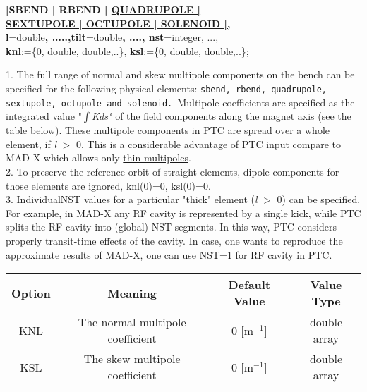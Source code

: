 \begin{description}
	\item[Additional Options for Physical Elements] 
	\item {\textbf{[SBEND | RBEND | \href{PTC_CREATE_LAYOUT0}{
                QUADRUPOLE | \\ SEXTUPOLE | OCTUPOLE | SOLENOID ], }\\ 
            l}=double\textbf{, .....,tilt}=double\textbf{, ...., nst}=integer, ...,\\
          \textbf{knl}:=\{0, double, double,..\}, \textbf{ksl}:=\{0,
          double, double,..\};} 
	\item[Description]
	1. The full range of  normal and skew multipole components on
        the bench can be  specified for the following physical elements:
        \texttt{sbend, rbend, quadrupole, sextupole,  octupole and
          solenoid. }Multipole coefficients are specified as the
        integrated value "$\int$\textit{Kds"}  of the field components
        along the magnet axis (see
        \hyperlink{Multipoles_on_Bench_(PTC_only)}{the table}
        below). These multipole components in PTC are spread over a
        whole   element, if \textit{l }$>$ 0. This is a considerable
        advantage of PTC input compare  to MAD-X  which allows only
        \href{../Introduction/multipole.html}{ thin multipoles}. \\
        2. To preserve the reference orbit of straight elements, dipole
        components  for those elements are   ignored, knl(0)=0,
        ksl(0)=0. \\ 
        3. \href{individual}{Individual}\hyperlink{NST}{NST} values for
        a  particular "thick" element (\textit{l }$>$ 0) can be
        specified. For example,  in MAD-X any RF cavity is represented
        by a single kick, while  PTC splits the RF cavity into (global)
        NST segments. In this  way, PTC considers properly transit-time
        effects of the cavity.  In case, one wants to reproduce the
        approximate results of  MAD-X, one can use NST=1 for RF cavity
        in PTC. 
      \item[Multipoles on Bench  (PTC only)] 
        \begin{tabular}{cccc}
          \hline 
          \textbf{Option} & \textbf{Meaning} & \textbf{Default Value} &
          \textbf{Value Type} \\  
          \hline
          KNL & The normal multipole coefficient & 0 [m$^{-1}$]  & double array \\ 
          \hline
          KSL & The skew multipole coefficient & 0 [m$^{-1}$]  & double array \\ 
          \hline
        \end{tabular}
        

\end{description}
